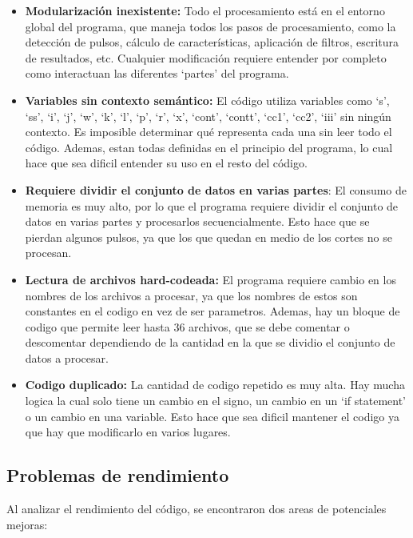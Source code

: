 \documentclass[12pt,a4paper]{article}
\begin{document}
\begin{itemize}

\item \textbf{Modularización inexistente:} Todo el procesamiento está en el entorno global del programa, que maneja todos los pasos de procesamiento, como la detección de pulsos, cálculo de características, aplicación de filtros, escritura de resultados, etc. Cualquier modificación requiere entender por completo como interactuan las diferentes `partes' del programa.

\item \textbf{Variables sin contexto semántico:} El código utiliza variables como `s', `ss', `i', `j', `w', `k', `l', `p', `r', `x', `cont', `contt', `cc1', `cc2', `iii' sin ningún contexto. Es
imposible determinar qué representa cada una sin leer todo el código. Ademas, estan todas definidas en el principio del programa, lo cual hace que sea dificil entender su uso en el resto del código.
    
\item \textbf{Requiere dividir el conjunto de datos en varias partes}: El consumo de memoria es muy alto, por lo que el programa requiere dividir el conjunto de datos en varias partes y procesarlos secuencialmente. Esto hace que se pierdan algunos pulsos, ya que los que quedan en medio de los cortes no se procesan.

\item \textbf{Lectura de archivos hard-codeada:} El programa requiere cambio en los nombres de los archivos a procesar, ya que los nombres de estos son constantes en el codigo en vez de ser parametros. Ademas, hay un bloque de codigo que permite leer hasta 36 archivos, que se debe comentar o descomentar dependiendo de la cantidad en la que se dividio el conjunto de datos a procesar.

\item \textbf{Codigo duplicado:} La cantidad de codigo repetido es muy alta. Hay mucha logica la cual solo tiene un cambio en el signo, un cambio en un `if statement' o un cambio en una variable. Esto hace que sea dificil mantener el codigo ya que hay que modificarlo en varios lugares.

\end{itemize}

\subsection{Problemas de rendimiento}

Al analizar el rendimiento del código, se encontraron dos areas de potenciales mejoras:
\end{document}
